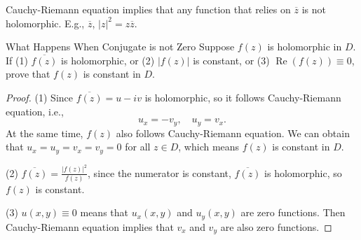 \begin{note}
  Cauchy-Riemann equation implies that any function that relies on
  $\overline{z}$ is not holomorphic.
  E.g., $\overline{z}$, $|z|^2 = z\overline{z}$.
\end{note}

\begin{example}{What Happens When Conjugate is not Zero}{}
  Suppose $f(z)$ is holomorphic in $D$.
  If (1) $\overline{f(z)}$ is holomorphic,
  or (2) $|f(z)|$ is constant,
  or (3) $\operatorname{Re}(f(z)) \equiv 0$,
  prove that $f(z)$ is constant in $D$.
\end{example}

\begin{proof}
  (1) Since $\overline{f(z)} = u - iv$ is holomorphic, so it follows Cauchy-Riemann equation, i.e.,
  \begin{equation}
    u_x = -v_y, \quad u_y = v_x.
  \end{equation}
  At the same time, $f(z)$ also follows Cauchy-Riemann equation.
  We can obtain that $u_x = u_y = v_x = v_y = 0$ for all $z \in D$,
  which means $f(z)$ is constant in $D$.

  (2) $\overline{f(z)} = \frac{|f(z)|^2}{f(z)}$, since the numerator is constant,
  $\overline{f(z)}$ is holomorphic, so $f(z)$ is constant.

  (3) $u(x,y) \equiv 0$ means that $u_x(x,y)$ and $u_y(x,y)$ are zero functions.
  Then Cauchy-Riemann equation implies that $v_x$ and $v_y$ are also zero functions.
\end{proof}



